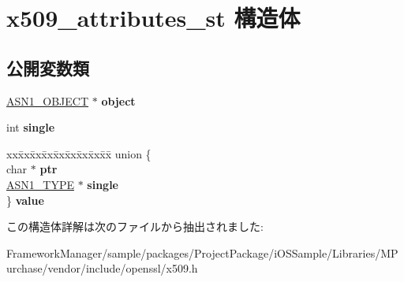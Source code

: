 \hypertarget{structx509__attributes__st}{}\section{x509\+\_\+attributes\+\_\+st 構造体}
\label{structx509__attributes__st}
\subsection*{公開変数類}
\begin{DoxyCompactItemize}
\item 
\hypertarget{structx509__attributes__st_a646d7a1b46e88eb3b0e337e08bd08a02}{}\hyperlink{structasn1__object__st}{A\+S\+N1\+\_\+\+O\+B\+J\+E\+C\+T} $\ast$ {\bfseries object}\label{structx509__attributes__st_a646d7a1b46e88eb3b0e337e08bd08a02}

\item 
\hypertarget{structx509__attributes__st_a04dd95e9253f6b16f682e70eb5eec2ca}{}int {\bfseries single}\label{structx509__attributes__st_a04dd95e9253f6b16f682e70eb5eec2ca}

\item 
\hypertarget{structx509__attributes__st_aed390d3e1a99081ab4cb4834c33d842b}{}\begin{tabbing}
xx\=xx\=xx\=xx\=xx\=xx\=xx\=xx\=xx\=\kill
union \{\\
\>char $\ast$ {\bfseries ptr}\\
\>\hyperlink{structasn1__type__st}{ASN1\_TYPE} $\ast$ {\bfseries single}\\
\} {\bfseries value}\label{structx509__attributes__st_aed390d3e1a99081ab4cb4834c33d842b}
\\

\end{tabbing}\end{DoxyCompactItemize}


この構造体詳解は次のファイルから抽出されました\+:\begin{DoxyCompactItemize}
\item 
Framework\+Manager/sample/packages/\+Project\+Package/i\+O\+S\+Sample/\+Libraries/\+M\+Purchase/vendor/include/openssl/x509.\+h\end{DoxyCompactItemize}
